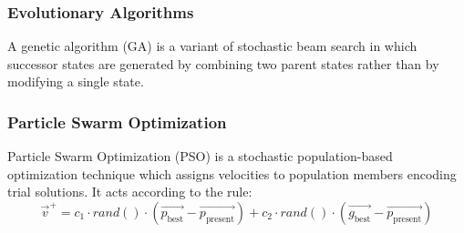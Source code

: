 \subsubsection{Evolutionary Algorithms}
A genetic algorithm (GA) is a variant of stochastic beam search in which successor states are generated by combining two parent states rather than by modifying a single state.

\begin{algorithmic}[1]
            \State{}



                \State{}
                \EndIf{}

            \EndFor{}
        \EndWhile{}

        \State{}
    \EndFunction{}


        \State{}


    \EndFunction{}
\end{algorithmic}

\subsubsection{Particle Swarm Optimization}
Particle Swarm Optimization (PSO) is a stochastic population-based optimization technique which assigns velocities to population members encoding trial solutions. It acts according to the rule:
\begin{equation*}
    \overrightarrow{v}^+ = c_1 \cdot rand() \cdot (\overrightarrow{p_\text{best}} - \overrightarrow{p_\text{present}}) + c_2 \cdot rand() \cdot (\overrightarrow{g_\text{best}} - \overrightarrow{p_\text{present}})
\end{equation*}

